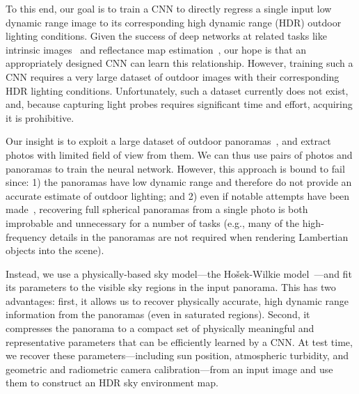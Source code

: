 To this end, our goal is to train a CNN to directly regress a single input low dynamic range image to its corresponding high dynamic range (HDR) outdoor lighting conditions. Given the success of deep networks at related tasks like intrinsic images~\cite{zhou2015intrinsic} and reflectance map estimation~\cite{rematas-cvpr-16}, our hope is that an appropriately designed CNN can learn this relationship. However, training such a CNN requires a very large dataset of outdoor images with their corresponding HDR lighting conditions. Unfortunately, such a dataset currently does not exist, and, because capturing light probes requires significant time and effort, acquiring it is prohibitive.

Our insight is to exploit a large dataset of outdoor panoramas~\cite{xiao-cvpr-12}, and extract photos with limited field of view from them. We can thus use pairs of photos and panoramas to train the neural network. However, this approach is bound to fail since: 1) the panoramas have low dynamic range and therefore do not provide an accurate estimate of outdoor lighting; and 2) even if notable attempts have been made~\cite{zhang-cvpr-13}, recovering full spherical panoramas from a single photo is both improbable and unnecessary for a number of tasks (e.g., many of the high-frequency details in the panoramas are not required when rendering Lambertian objects into the scene).

Instead, we use a physically-based sky model---the Ho\v{s}ek-Wilkie model~\cite{hosek-siggraph-12,hosek-cga-13}---and fit its parameters to the visible sky regions in the input panorama. This has two advantages: first, it allows us to recover physically accurate, high dynamic range information from the panoramas (even in saturated regions). Second, it compresses the panorama to a compact set of physically meaningful and representative parameters that can be efficiently learned by a CNN. At test time, we recover these parameters---including sun position, atmospheric turbidity, and geometric and radiometric camera calibration---from an input image and use them to construct an HDR sky environment map. 


